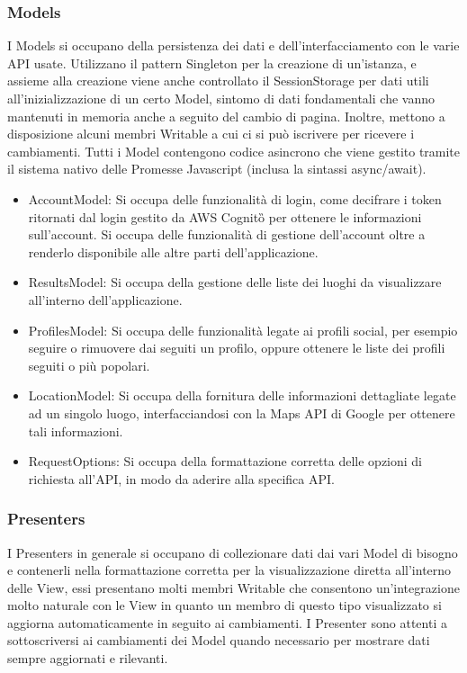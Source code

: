     \subsubsection{Models}
        I Models si occupano della persistenza dei dati e dell'interfacciamento con le varie API usate. Utilizzano il pattern Singleton per la creazione di un'istanza, e assieme alla creazione viene anche controllato il SessionStorage 
        per dati utili all'inizializzazione di un certo Model, sintomo di dati fondamentali che vanno mantenuti in memoria anche a seguito del cambio di pagina. Inoltre, mettono a disposizione alcuni membri Writable a cui ci si può iscrivere per ricevere i cambiamenti.
        Tutti i Model contengono codice asincrono che viene gestito tramite il sistema nativo delle Promesse Javascript (inclusa la sintassi async/await).
        \begin{itemize}
            \item AccountModel: Si occupa delle funzionalità di login, come decifrare i token ritornati dal login gestito da AWS Cognito\G{} per ottenere le informazioni sull'account. Si occupa delle funzionalità di gestione dell'account oltre a renderlo disponibile alle altre parti dell'applicazione.
            \item ResultsModel: Si occupa della gestione delle liste dei luoghi da visualizzare all'interno dell'applicazione.
            \item ProfilesModel: Si occupa delle funzionalità legate ai profili social, per esempio seguire o rimuovere dai seguiti un profilo, oppure ottenere le liste dei profili seguiti o più popolari.
            \item LocationModel: Si occupa della fornitura delle informazioni dettagliate legate ad un singolo luogo, interfacciandosi con la Maps API di Google per ottenere tali informazioni.
            \item RequestOptions: Si occupa della formattazione corretta delle opzioni di richiesta all'API, in modo da aderire alla specifica API.
        \end{itemize}
    \subsubsection{Presenters}
        I Presenters in generale si occupano di collezionare dati dai vari Model di bisogno e contenerli nella formattazione corretta per la visualizzazione diretta all'interno delle View, essi presentano molti membri Writable che consentono
        un'integrazione molto naturale con le View in quanto un membro di questo tipo visualizzato si aggiorna automaticamente in seguito ai cambiamenti. I Presenter sono attenti a sottoscriversi ai cambiamenti dei Model quando necessario per mostrare dati sempre aggiornati e rilevanti.
